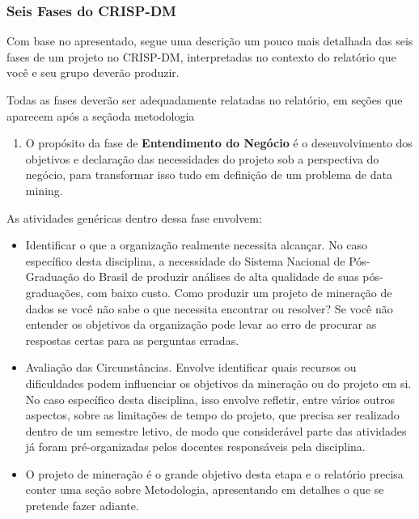 \documentclass[]{article}
\providecommand{\tightlist}{%
  \setlength{\itemsep}{0pt}\setlength{\parskip}{0pt}}
\begin{document}
\subsubsection{Seis Fases do CRISP-DM}\label{seis-fases-do-crisp-dm}

Com base no apresentado, segue uma descrição um pouco mais detalhada das
seis fases de um projeto no CRISP-DM, interpretadas no contexto do
relatório que você e seu grupo deverão produzir.

Todas as fases deverão ser adequadamente relatadas no relatório, em
seções que aparecem após a seçãoda metodologia

\begin{enumerate}
\def\labelenumi{\arabic{enumi}.}
\tightlist
\item
  O propósito da fase de \textbf{Entendimento do Negócio} é o
  desenvolvimento dos objetivos e declaração das necessidades do projeto
  sob a perspectiva do negócio, para transformar isso tudo em definição
  de um problema de data mining.
\end{enumerate}

As atividades genéricas dentro dessa fase envolvem:

\begin{itemize}
\item
  Identificar o que a organização realmente necessita alcançar. No caso
  específico desta disciplina, a necessidade do Sistema Nacional de
  Pós-Graduação do Brasil de produzir análises de alta qualidade de suas
  pós-graduações, com baixo custo. Como produzir um projeto de mineração
  de dados se você não sabe o que necessita encontrar ou resolver? Se
  você não entender os objetivos da organização pode levar ao erro de
  procurar as respostas certas para as perguntas erradas.
\item
  Avaliação das Circunstâncias. Envolve identificar quais recursos ou
  dificuldades podem influenciar os objetivos da mineração ou do projeto
  em si. No caso específico desta disciplina, isso envolve refletir,
  entre vários outros aspectos, sobre as limitações de tempo do projeto,
  que precisa ser realizado dentro de um semestre letivo, de modo que
  considerável parte das atividades já foram pré-organizadas pelos
  docentes responsáveis pela disciplina.
\item
  O projeto de mineração é o grande objetivo desta etapa e o relatório
  precisa conter uma seção sobre Metodologia, apresentando em detalhes o
  que se pretende fazer adiante.
\end{itemize}
\end{document}
